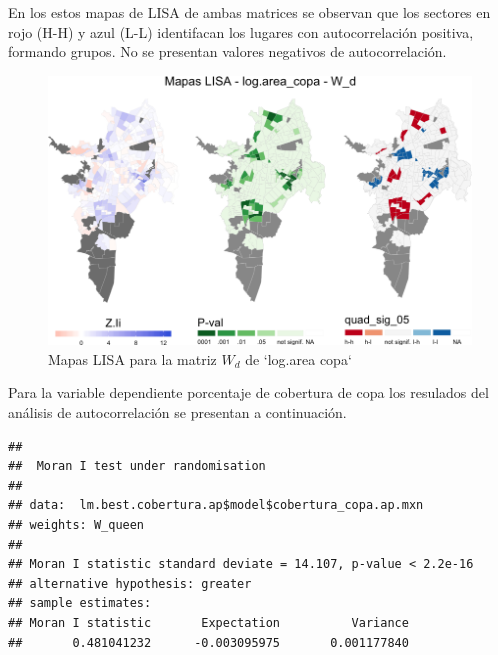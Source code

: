 \documentclass[12pt,]{book}
\newenvironment{Shaded}{\begin{snugshade}}{\end{snugshade}}
\newcommand{\KeywordTok}[1]{\textcolor[rgb]{0.13,0.29,0.53}{\textbf{#1}}}
\newcommand{\DataTypeTok}[1]{\textcolor[rgb]{0.13,0.29,0.53}{#1}}
\newcommand{\OtherTok}[1]{\textcolor[rgb]{0.56,0.35,0.01}{#1}}
\newcommand{\OperatorTok}[1]{\textcolor[rgb]{0.81,0.36,0.00}{\textbf{#1}}}
\newcommand{\NormalTok}[1]{#1}
\begin{document}
En los estos mapas de LISA de ambas matrices se observan que los
sectores en rojo (H-H) y azul (L-L) identifacan los lugares con
autocorrelación positiva, formando grupos. No se presentan valores
negativos de autocorrelación.

\begin{figure}
\includegraphics[width=1\linewidth]{tesis-unigis_files/figure-latex/mapas-lisa-copa-wd-1} \caption{Mapas LISA para la matriz $W_d$ de `log.area copa`}\label{fig:mapas-lisa-copa-wd}
\end{figure}

Para la variable dependiente porcentaje de cobertura de copa los
resulados del análisis de autocorrelación se presentan a continuación.

\begin{Shaded}
\end{Shaded}

\begin{verbatim}
## 
##  Moran I test under randomisation
## 
## data:  lm.best.cobertura.ap$model$cobertura_copa.ap.mxn  
## weights: W_queen  
## 
## Moran I statistic standard deviate = 14.107, p-value < 2.2e-16
## alternative hypothesis: greater
## sample estimates:
## Moran I statistic       Expectation          Variance 
##       0.481041232      -0.003095975       0.001177840
\end{verbatim}

\begin{Shaded}
\end{Shaded}
\end{document}
